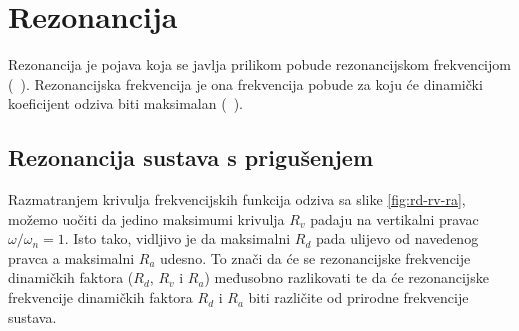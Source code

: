 \section{Rezonancija}
Rezonancija je pojava koja se javlja prilikom pobude rezonancijskom frekvencijom (~\cite{dk_skripta}).
Rezonancijska frekvencija je ona frekvencija pobude za koju će dinamički koeficijent
odziva biti maksimalan (~\cite{dk_skripta}). 
\par

\subsection{Rezonancija sustava s prigušenjem}
Razmatranjem krivulja frekvencijskih funkcija odziva sa slike 
\ref{fig:rd-rv-ra}, možemo uočiti da jedino maksimumi krivulja $R_v$ padaju na 
vertikalni pravac $\omega/\omega_n=1$. Isto tako, vidljivo je da maksimalni $R_d$
pada ulijevo od navedenog pravca a maksimalni $R_a$ udesno. To znači da će se 
rezonancijske frekvencije dinamičkih faktora ($R_d$, $R_v$ i $R_a$) međusobno razlikovati 
te da će rezonancijske frekvencije dinamičkih faktora $R_d$ i $R_a$ biti različite od
prirodne frekvencije sustava.

